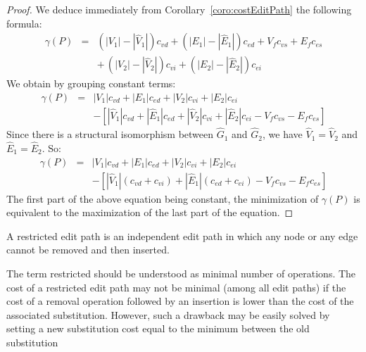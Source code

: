 \begin{proof}
  We deduce immediately from Corollary~\ref{coro:costEditPath} the
  following formula:
  \renewcommand{\arraystretch}{1.5}
  \begin{equation*}
    \begin{array}{lcl}
      \gamma(P) & = & (|V_1|-|\hat{V}_1|)c_{vd}+(|E_1|-|\hat{E}_1|)c_{ed}+V_fc_{vs}+E_fc_{es}\\
      &   & +\,(|V_2|-|\hat{V}_2|)c_{vi}+(|E_2|-|\hat{E}_2|)c_{ei}
    \end{array}
  \end{equation*}
  We obtain by grouping constant terms:
  \renewcommand{\arraystretch}{1.5}
  \begin{equation*}
    \begin{array}{lcl}
      \gamma(P) & = & |V_1|c_{vd}+|E_1|c_{ed}+|V_2|c_{vi}+|E_2|c_{ei}\\
      & & - \left[
        |\hat{V}_1|c_{vd}+|\hat{E}_1|c_{ed}+|\hat{V}_2|c_{vi}+|\hat{E}_2|c_{ei}-V_fc_{vs}-E_fc_{es}\right]
    \end{array}
  \end{equation*}
  Since there is a structural isomorphism between $\hat{G}_1$ and
  $\hat{G}_2$, we have $\hat{V}_1=\hat{V}_2$ and
  $\hat{E}_1=\hat{E}_2$. So:
  \begin{equation*}
    \begin{array}{lcl}
      \gamma(P) & = & |V_1|c_{vd}+|E_1|c_{ed}+|V_2|c_{vi}+|E_2|c_{ei} \\
      & & - \left[
        |\hat{V}_1|(c_{vd}+c_{vi})+
        |\hat{E}_1|(c_{ed}+c_{ei})-V_fc_{vs}-E_fc_{es}\right]
    \end{array}
  \end{equation*}
  The first part of the above equation being constant, the
  minimization of $\gamma(P)$ is equivalent to the maximization of
  the last part of the equation.
\end{proof}
\begin{definition}
  A restricted edit path is an independent edit path in which any node or
  any edge cannot be removed and then inserted.
\end{definition}
The term restricted should be understood as minimal number
of operations. The cost of a restricted edit path may not be minimal
(among all edit paths) if the cost of a removal operation followed by
an insertion is lower than the cost of the associated
substitution. However, such a drawback may be easily solved by setting
a new substitution cost equal to the minimum between the old substitution
